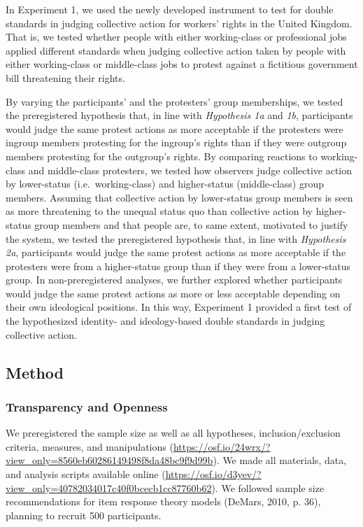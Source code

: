 \documentclass[12pt, letterpaper]{article}
\begin{document}
In Experiment 1, we used the newly developed instrument to test for
double standards in judging collective action for workers' rights in the
United Kingdom. That is, we tested whether people with either
working-class or professional jobs applied different standards when
judging collective action taken by people with either working-class or
middle-class jobs to protest against a fictitious government bill
threatening their rights.

By varying the participants' and the protesters' group memberships, we
tested the preregistered hypothesis that, in line with \emph{Hypothesis
1a} and \emph{1b}, participants would judge the same protest actions as
more acceptable if the protesters were ingroup members protesting for
the ingroup's rights than if they were outgroup members protesting for
the outgroup's rights. By comparing reactions to working-class and
middle-class protesters, we tested how observers judge collective action
by lower-status (i.e.~working-class) and higher-status (middle-class)
group members. Assuming that collective action by lower-status group
members is seen as more threatening to the unequal status quo than
collective action by higher-status group members and that people are, to
same extent, motivated to justify the system, we tested the
preregistered hypothesis that, in line with \emph{Hypothesis 2a},
participants would judge the same protest actions as more acceptable if
the protesters were from a higher-status group than if they were from a
lower-status group. In non-preregistered analyses, we further explored
whether participants would judge the same protest actions as more or
less acceptable depending on their own ideological positions. In this
way, Experiment 1 provided a first test of the hypothesized identity-
and ideology-based double standards in judging collective action.

\hypertarget{method}{%
\subsection{Method}\label{method}}

\hypertarget{transparency-and-openness}{%
\subsubsection{Transparency and
Openness}\label{transparency-and-openness}}

We preregistered the sample size as well as all hypotheses,
inclusion/exclusion criteria, measures, and manipulations
(\url{https://osf.io/24wrx/?view_only=8560eb60286149498f8da48bc9f9d99b}).
We made all materials, data, and analysis scripts available online
(\url{https://osf.io/d3yev/?view_only=40782034017c40f0bcecb1cc87760b62}).
We followed sample size recommendations for item response theory models
(DeMars, 2010, p. 36), planning to recruit 500 participants.
\end{document}
